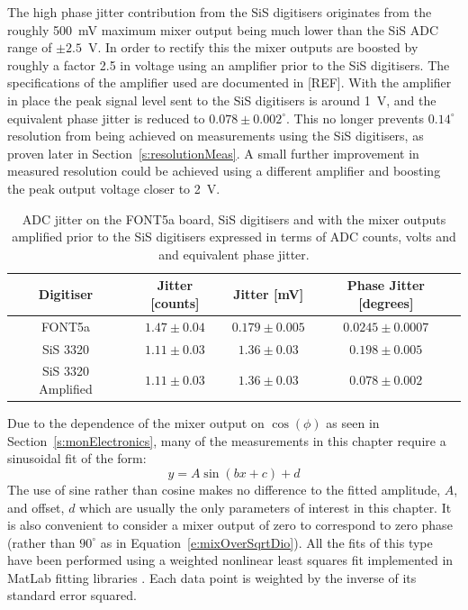 The high phase jitter contribution from the SiS digitisers originates from the roughly 500~mV maximum mixer output being much lower than the SiS ADC range of \(\pm2.5\)~V. In order to rectify this the mixer outputs are boosted by roughly a factor 2.5 in voltage using an amplifier prior to the SiS digitisers. The specifications of the amplifier used are documented in [REF]. With the amplifier in place the peak signal level sent to the SiS digitisers is around 1~V, and the equivalent phase jitter is reduced to \(0.078\pm0.002^\circ\). This no longer prevents \(0.14^\circ\) resolution from being achieved on measurements using the SiS digitisers, as proven later in Section~\ref{s:resolutionMeas}. A small further improvement in measured resolution could be achieved using a different amplifier and boosting the peak output voltage closer to 2~V.

\begin{table}
  \begin{center}
    \begin{tabular}{|c c c c|}
	   \hline
       Digitiser & Jitter [counts] & Jitter [mV] & Phase Jitter [degrees] \\ \hline
       FONT5a & \(1.47\pm0.04\) & \(0.179\pm0.005\) & \(0.0245\pm0.0007\)\\ 
       SiS 3320 & \(1.11\pm0.03\) & \(1.36\pm0.03\) & \(0.198\pm0.005\)\\
       SiS 3320 Amplified & \(1.11\pm0.03\) & \(1.36\pm0.03\) & \(0.078\pm0.002\)\\ \hline
    \end{tabular}
    \caption{ADC jitter on the FONT5a board, SiS digitisers and with the mixer outputs amplified prior to the SiS digitisers expressed in terms of ADC counts, volts and and equivalent phase jitter.}
  	\label{t:adcNoise}
  \end{center}
\end{table}




Due to the dependence of the mixer output on \(\cos(\phi)\) as seen in Section~\ref{s:monElectronics}, many of the measurements in this chapter require a sinusoidal fit of the form:
\begin{equation}
y = A\sin(bx + c) + d
\label{e:generalSinEq}
\end{equation}
The use of sine rather than cosine makes no difference to the fitted amplitude, \(A\), and offset, \(d\) which are usually the only parameters of interest in this chapter. It is also convenient to consider a mixer output of zero to correspond to zero phase (rather than \(90^\circ\) as in Equation~\ref{e:mixOverSqrtDio}). All the fits of this type have been performed using a weighted nonlinear least squares fit implemented in MatLab fitting libraries \cite{MatLabFit}. Each data point is weighted by the inverse of its standard error squared.

